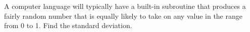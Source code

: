 A computer language will typically have a built-in
subroutine that produces a fairly random number that is equally
likely to take on any value in the range from 0 to 1.
Find the standard deviation.\answercheck

